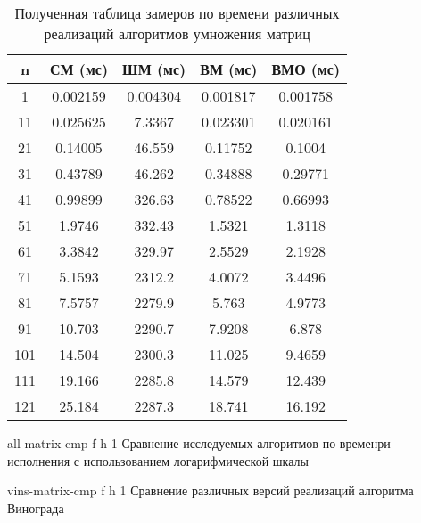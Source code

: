 \begin{table}[!ht]
	\centering
	\caption{Полученная таблица замеров по времени различных реализаций алгоритмов умножения матриц}
	\begin{tabular}{|c|c|c|c|c|}
		\hline
		n   & СМ (мс)  & ШМ (мс)  & \multicolumn{1}{c|}{ВМ (мс)} & ВМО (мс) \\ \hline
		1   & 0.002159 & 0.004304 & 0.001817                     & 0.001758 \\ \hline
		11  & 0.025625 & 7.3367   & 0.023301                     & 0.020161 \\ \hline
		21  & 0.14005  & 46.559   & 0.11752                      & 0.1004   \\ \hline
		31  & 0.43789  & 46.262   & 0.34888                      & 0.29771  \\ \hline
		41  & 0.99899  & 326.63   & 0.78522                      & 0.66993  \\ \hline
		51  & 1.9746   & 332.43   & 1.5321                       & 1.3118   \\ \hline
		61  & 3.3842   & 329.97   & 2.5529                       & 2.1928   \\ \hline
		71  & 5.1593   & 2312.2   & 4.0072                       & 3.4496   \\ \hline
		81  & 7.5757   & 2279.9   & 5.763                        & 4.9773   \\ \hline
		91  & 10.703   & 2290.7   & 7.9208                       & 6.878    \\ \hline
		101 & 14.504   & 2300.3   & 11.025                       & 9.4659   \\ \hline
		111 & 19.166   & 2285.8   & 14.579                       & 12.439   \\ \hline
		121 & 25.184   & 2287.3   & 18.741                       & 16.192   \\ \hline
	\end{tabular}
	\label{t:timings}
\end{table}



{all-matrix-cmp} %
{f} %
{h} %
{1\textwidth} %
{Сравнение исследуемых алгоритмов по временри исполнения с использованием логарифмической шкалы} %

{vins-matrix-cmp} %
{f} %
{h} %
{1\textwidth} %
{Сравнение различных версий реализаций алгоритма Винограда} %

